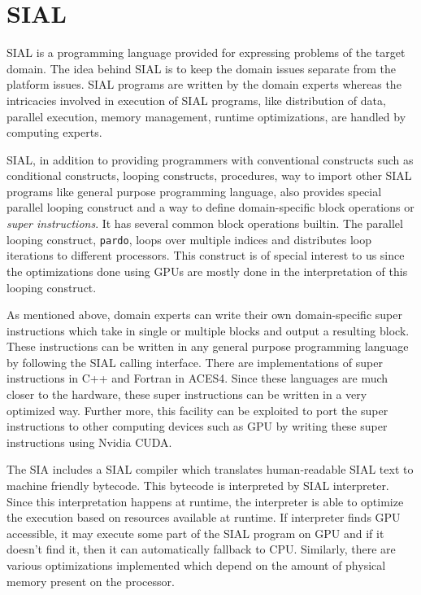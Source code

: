 \section{SIAL}
SIAL is a programming language provided for expressing problems of the target
domain. The idea behind SIAL is to keep the domain issues separate from
the platform issues. SIAL programs are written by the domain experts
whereas the intricacies involved in execution of SIAL programs, like distribution of
data, parallel execution, memory management, runtime optimizations, are handled
by computing experts.

SIAL, in addition to providing programmers with conventional constructs such as
conditional constructs, looping constructs, procedures, way to import other SIAL
programs like general purpose programming language, also provides special parallel looping construct and a way
to define domain-specific block operations or \textit{super instructions}. It
has several common block operations builtin. The
parallel looping construct, \texttt{pardo}, loops over multiple indices and
distributes loop iterations to different processors. This construct is of special
interest to us since the optimizations done using GPUs are mostly done in the
interpretation of this looping construct.

As mentioned above, domain experts can write their own domain-specific
super instructions which take in single or multiple blocks and output a resulting block. These
instructions can be written in any general purpose programming language by following
the SIAL calling interface. There are implementations of super instructions in
C++ and Fortran in ACES4. Since these languages are much
closer to the hardware, these super instructions can be written in a very
optimized way. Further more, this facility can be exploited to port the super instructions to
other computing devices such as GPU by writing these super instructions using
Nvidia CUDA.

The SIA includes a SIAL compiler which translates human-readable SIAL text to
machine friendly bytecode. This bytecode is interpreted by SIAL interpreter.
Since this interpretation happens at runtime, the interpreter is able to optimize the
execution based on resources available at runtime. If interpreter finds GPU
accessible, it may execute some part of the SIAL program on GPU and if it
doesn't find it, then it can automatically fallback to CPU. Similarly, there are
various optimizations implemented which depend on the amount of physical memory
present on the processor.

